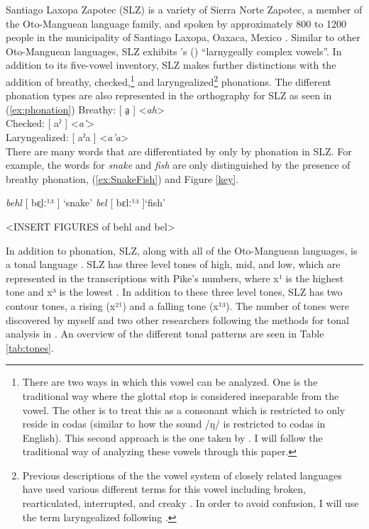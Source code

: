 \documentclass[12pt, letterpaper]{article}
\begin{document}
Santiago Laxopa Zapotec (SLZ) is a variety of Sierra Norte Zapotec, a member of the Oto-Manguean language family, and spoken by approximately 800 to 1200 people in the municipality of Santiago Laxopa, Oaxaca, Mexico \citep{adlerDerivationVerbInitiality2018,sichelPronounsAttractionSierra2020}. Similar to other Oto-Manguean languages, SLZ exhibits \citeauthor{silvermanLaryngealComplexityOtomanguean1997}'s (\citeyear{silvermanLaryngealComplexityOtomanguean1997}) ``larnygeally complex vowels''. In addition to its five-vowel inventory, SLZ makes further distinctions with the addition of breathy, checked,\footnote{There are two ways in which this vowel can be analyzed. One is the traditional way where the glottal stop is considered inseparable from the vowel. The other is to treat this as a consonant which is restricted to only reside in codas (similar to how the sound /ŋ/ is restricted to codas in English). This second approach is the one taken by \citet{avelinobecerraTopicsYalalagZapotec2004}. I will follow the traditional way of analyzing these vowels through this paper.} and laryngealized\footnote{Previous descriptions of the the vowel system of closely related languages have used various different terms for this vowel including broken, rearticulated, interrupted, and creaky \citep{longDiccionarioZapotecoSan2005,avelinoAcousticElectroglottographicAnalyses2010,avelinobecerraTopicsYalalagZapotec2004,sonnenscheinDescriptiveGrammarSan2005,adlerAcousticsPhonationTypes2016}. In order to avoid confusion, I will use the term laryngealized following \citet{avelinoAcousticElectroglottographicAnalyses2010}.} phonations. The different phonation types are also represented in the orthography for SLZ as seen in (\ref{ex:phonation})
\ea \label{ex:phonation}
	Breathy: [ a̤ ] <\textit{ah}> \\
	Checked: [ aˀ ] <\textit{a'}> \\
	Laryngealized: [ aˀa ] <\textit{a'a}> \\
\z
There are many words that are differentiated by only by phonation in SLZ. For example, the words for \emph{snake} and \emph{fish} are only distinguished by the presence of breathy phonation, (\ref{ex:SnakeFish}) and Figure \ref{key}. 

\ea \label{ex:SnakeFish}
	\ea \textit{behl} [ bɛ̤lː¹³ ] `snake'
	\ex \textit{bel} [ bɛlː¹³ ]`fish'
	\z  
\z 
	
<INSERT FIGURES of behl and bel>  

In addition to phonation, SLZ, along with all of the Oto-Manguean languages, is a tonal language \citep{brinkerhoffDownstepSantiagoLaxopaMFM}. SLZ has three level tones of high, mid, and low, which are represented in the transcriptions with Pike's numbers, where x¹ is the highest tone and x³ is the lowest \citep{pikeToneLanguagesTechnique1948,weePhonologicalTone2019}. In addition to these three level tones, SLZ has two contour tones, a rising (x²¹) and a falling tone (x¹³). The number of tones were discovered by myself and two other researchers following the methods for tonal analysis in \citet{pikeToneLanguagesTechnique1948,sniderToneAnalysisField2018}. An overview of the different tonal patterns are seen in Table \ref{tab:tones}.
\end{document}
